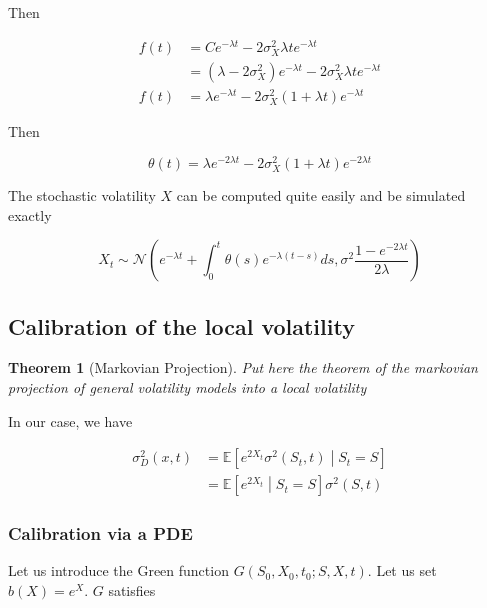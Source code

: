 \documentclass{article}
\newtheorem{theorem}{Theorem}[section]
\begin{document}
\noindent Then

\begin{equation}
\begin{aligned}
	f(t) &= Ce^{-\lambda t} - 2 \sigma_X^2 \lambda t e^{-\lambda t}\\
	&= \left(\lambda - 2\sigma_X^2 \right) e^{-\lambda t} - 2 \sigma_X^2 \lambda t e^{-\lambda t}\\
	f(t) &= \lambda e^{-\lambda t} - 2\sigma_X^2 (1 + \lambda t) e^{-\lambda t}
\end{aligned}
\end{equation}

\noindent Then

\begin{equation}
	\theta(t) = \lambda e^{-2\lambda t} -2 \sigma_X^2 (1 + \lambda t) e^{-2\lambda t}
\end{equation}

\noindent The stochastic volatility $X$ can be computed quite easily and be simulated exactly

\begin{equation}
	X_t \sim \mathcal{N}\left(e^{-\lambda t} + \int_0^t \theta(s) e^{-\lambda (t-s)} ds, \sigma^2 \frac{1 - e^{-2\lambda t}}{2\lambda}\right)
\end{equation}

\subsection{Calibration of the local volatility}

\begin{theorem}[Markovian Projection]
Put here the theorem of the markovian projection of general volatility models into a local volatility
\end{theorem}

\noindent In our case, we have

\begin{equation}
\begin{aligned}
	\sigma_D^2(x, t) &= \mathbb{E} \left[ e^{2X_t} \sigma^2(S_t, t) \middle| S_t = S\right]\\
	&= \mathbb{E}\left[e^{2X_t} \middle| S_t = S \right] \sigma^2(S,t)
\end{aligned}
\end{equation}

\subsubsection{Calibration via a PDE}
\noindent Let us introduce the Green function $G(S_0, X_0, t_0 ; S, X, t)$.  Let us set $b(X) = e^{X}$. $G$ satisfies
\end{document}
